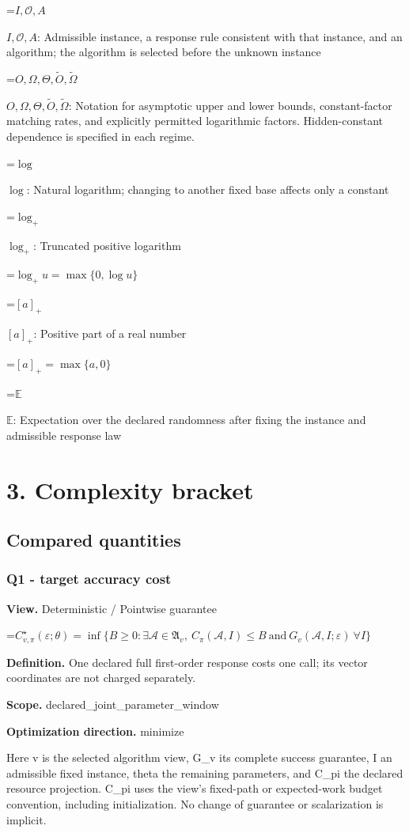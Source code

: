 \documentclass[10pt,a4paper]{article}
\newcommand{\AtlasMath}[1]{\par\begingroup\centering\setbox0=\hbox{$\displaystyle #1$}\ifdim\wd0>1.4\linewidth\typeout{ATLAS WIDE FORMULA: \the\wd0}\fi\ifdim\wd0>\linewidth\resizebox{\linewidth}{!}{\box0}\else\box0\fi\par\endgroup}
\newcommand{\AtlasInlineMath}[1]{\begingroup\setbox0=\hbox{$#1$}\ifdim\wd0>.4\linewidth\endgroup\AtlasMath{#1}\else\endgroup$#1$\fi}
\begin{document}
\AtlasInlineMath{I,\mathcal{O},A}: Admissible instance, a response rule consistent with that instance, and an algorithm; the algorithm is selected before the unknown instance

\AtlasInlineMath{O,\Omega,\Theta,\widetilde{O},\widetilde\Omega}: Notation for asymptotic upper and lower bounds, constant-factor matching rates, and explicitly permitted logarithmic factors. Hidden-constant dependence is specified in each regime.

\AtlasInlineMath{\log}: Natural logarithm; changing to another fixed base affects only a constant

\AtlasInlineMath{\log_+}: Truncated positive logarithm


\AtlasMath{\log_+u=\max\{0,\log u\}}


\AtlasInlineMath{[a]_+}: Positive part of a real number


\AtlasMath{[a]_+=\max\{a,0\}}


\AtlasInlineMath{\mathbb{E}}: Expectation over the declared randomness after fixing the instance and admissible response law

\section{3. Complexity bracket}
\subsection{Compared quantities}
\subsubsection{Q1 - target accuracy cost}
\textbf{View.} Deterministic / Pointwise guarantee

\AtlasMath{C^\star_{v,\pi}(\varepsilon;\theta)=\inf\{B\ge0:\exists\mathcal A\in\mathfrak A_v,\ C_\pi(\mathcal A,I)\le B\ \text{and}\ G_v(\mathcal A,I;\varepsilon)\ \forall I\}}
\textbf{Definition.} One declared full first-order response costs one call; its vector coordinates are not charged separately.

\textbf{Scope.} declared\_joint\_parameter\_window

\textbf{Optimization direction.} minimize

Here v is the selected algorithm view, G\_v its complete success guarantee, I an admissible fixed instance, theta the remaining parameters, and C\_pi the declared resource projection. C\_pi uses the view's fixed-path or expected-work budget convention, including initialization. No change of guarantee or scalarization is implicit.
\end{document}
